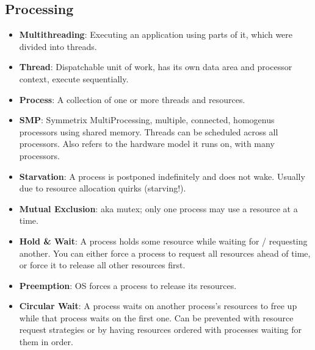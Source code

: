 \documentclass[fontsize=5pt]{scrartcl}
\begin{document}
\begin{multicols}{3}
     \subsection{Processing}
      \begin{itemize}       
       \item \textbf{Multithreading}: Executing an application using parts of it, which were divided into threads. 
       \item \textbf{Thread}: Dispatchable unit of work, has its own data area and processor context, execute sequentially.
       \item \textbf{Process}: A collection of one or more threads and resources.
       \item \textbf{SMP}: Symmetrix MultiProcessing, multiple, connected, homogenus processors using shared memory.
                           Threads can be scheduled across all processors. Also refers to the hardware model it runs on, with
                           many processors.
        \item \textbf{Starvation}: A process is postponed indefinitely and does not wake. Usually due to resource allocation quirks (starving!).
        \item \textbf{Mutual Exclusion}: aka mutex; only one process may use a resource at a time.
        \item \textbf{Hold \& Wait}: A process holds some resource while waiting for / requesting another. You can either force a process to request all resources ahead of time,
                                    or force it to release all other resources first.
        \item \textbf{Preemption}: OS forces a process to release its resources. 
        \item \textbf{Circular Wait}: A process waits on another process's resources to free up while that process waits on the first one.
                                      Can be prevented with resource request strategies or by having resources ordered with processes waiting for them in order.
      \end{itemize}

\end{multicols}
\end{document}
